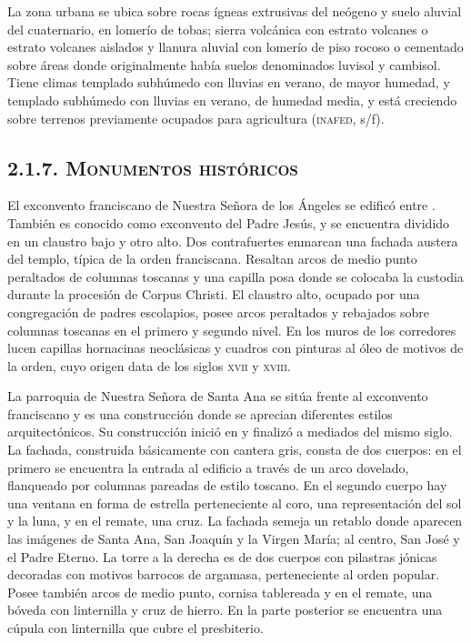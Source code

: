 \documentclass[14pt,letterpaper,twoside]{extbook} %
\begin{document}
\noindent La zona urbana se ubica sobre rocas ígneas extrusivas del neógeno y suelo aluvial del cuaternario, en lomerío de tobas; sierra volcánica con estrato volcanes o estrato volcanes aislados y llanura aluvial con lomerío de piso rocoso o cementado sobre áreas donde originalmente había suelos denominados luvisol y cambisol. Tiene climas templado subhúmedo con lluvias en verano, de mayor humedad, y templado subhúmedo con lluvias en verano, de humedad media, y está creciendo sobre terrenos previamente ocupados para agricultura (\textsc{inafed}, s/f).

\subsection*{\mdseries\large\textsc{2.1.7. Monumentos históricos}}

\noindent El exconvento franciscano de Nuestra Señora de los Ángeles se edificó entre . También es conocido como exconvento del Padre Jesús, y se encuentra dividido en un claustro bajo y otro alto. Dos contrafuertes enmarcan una fachada austera del templo, típica de la orden franciscana. Resaltan arcos de medio punto peraltados de columnas toscanas y una capilla posa donde se colocaba la custodia durante la procesión de Corpus Christi. El claustro alto, ocupado por una congregación de padres escolapios, posee arcos peraltados y rebajados sobre columnas toscanas en el primero y segundo nivel. En los muros de los corredores lucen capillas hornacinas neoclásicas y cuadros con pinturas al óleo de motivos de la orden, cuyo origen data de los siglos \textsc{xvii} y \textsc{xviii}.

La parroquia de Nuestra Señora de Santa Ana se sitúa frente al exconvento franciscano y es una construcción donde se aprecian diferentes estilos arquitectónicos. Su construcción inició en  y finalizó a mediados del mismo siglo. La fachada, construida básicamente con cantera gris, consta de dos cuerpos: en el primero se encuentra la entrada al edificio a través de un arco dovelado, flanqueado por columnas pareadas de estilo toscano. En el segundo cuerpo hay una ventana en forma de estrella perteneciente al coro, una representación del sol y la luna, y en el remate, una cruz. La fachada semeja un retablo donde aparecen las imágenes de Santa Ana, San Joaquín y la Virgen María; al centro, San José y el Padre Eterno. La torre a la derecha es de dos cuerpos con pilastras jónicas decoradas con motivos barrocos de argamasa, perteneciente al orden popular. Posee también arcos de medio punto, cornisa tablereada y en el remate, una bóveda con linternilla y cruz de hierro. En la parte posterior se encuentra una cúpula con linternilla que cubre el presbiterio.
\end{document}
